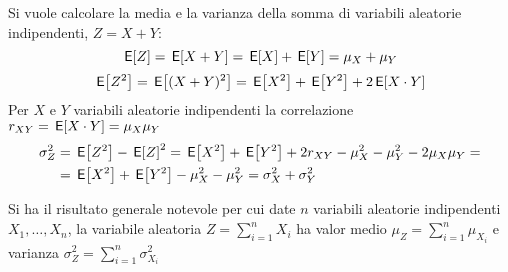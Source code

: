 \begin{esempio}
Si vuole calcolare la media e la varianza della somma di variabili aleatorie indipendenti, $Z=X+Y$:
\[
	\E{Z}=\E{X+Y}=\E{X}+\E{Y}=\mu_X+\mu_Y
\]
\[
	\E{Z^2}=\E{(X+Y)^2}=\E{X^2}+\E{Y^2}+2\E{X\cdot Y}
\]
Per $X$ e $Y$ variabili aleatorie indipendenti la correlazione $r_{XY}=\E{X\cdot Y}=\mu_X\mu_Y$
\[
	\begin{split}
		\sigma^2_Z&=\E{Z^2}-\E{Z}^2=\E{X^2}+\E{Y^2}+2r_{XY}-\mu^2_X-\mu^2_Y-2\mu_X\mu_Y=\\
		&=\E{X^2}+\E{Y^2}-\mu^2_X-\mu^2_Y=\sigma^2_X+\sigma^2_Y
	\end{split}
\]
\end{esempio}
\begin{nota}
	Si ha il risultato generale notevole per cui date $n$ variabili aleatorie indipendenti $X_1,\dots,X_n$, la variabile aleatoria $Z=\sum_{i=1}^{n}X_i$ ha valor medio $\mu_Z=\sum_{i=1}^{n}\mu_{X_i}$ e varianza $\sigma^2_Z=\sum_{i=1}^{n}\sigma^2_{X_i}$
\end{nota}

